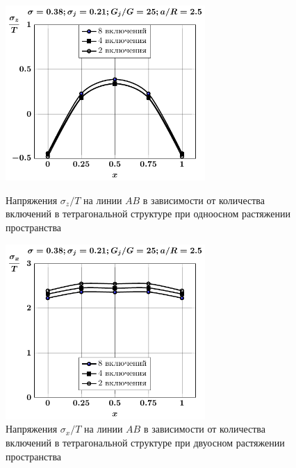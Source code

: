 %


\begin{figure}[h!]
\centering\footnotesize
\parbox[b]{7.5cm}{\centering\includegraphics[width=7.6cm]{inc8-4-2-a25-d95-g25-sig_z-spheres-tension1.pdf}
\caption{Напряжения $\sigma_z/T$ на линии  $AB$ в зависимости от количества включений в тетрагональной структуре при одноосном растяжении пространства
\label{f:8:20}}}\hfil\hfil
\parbox[b]{7.5cm}{\centering\includegraphics[width=7.6cm]{inc8-4-2-a25-d95-g25-sig_x-spheres-tension2.pdf}
\caption{Напряжения $\sigma_x/T$ на линии $AB$ в зависимости от количества включений в тетрагональной структуре при двуосном растяжении пространства
\label{f:8:24}}}
\end{figure}

